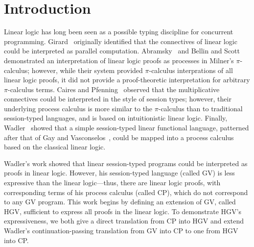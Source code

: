 \documentclass{easychair}
\newcommand{\hgv}{HGV\xspace}
\begin{document}
%
%



\section{Introduction}

Linear logic has long been seen as a possible typing discipline for concurrent programming.
Girard~\cite{Girard87} originally identified that the connectives of linear logic could be
interpreted as parallel computation. Abramsky~\cite{Abramsky92} and Bellin and
Scott~\cite{BellinScott94} demonstrated an interpretation of linear logic proofs as processes in
Milner's $\pi$-calculus; however, while their system provided $\pi$-calculus interprations of all
linear logic proofs, it did not provide a proof-theoretic interpretation for arbitrary
$\pi$-calculus terms. Caires and Pfenning~\cite{CairesPfenning10} observed that the multiplicative
connectives could be interpreted in the style of session types; however, their underlying process
calculus is more similar to the $\pi$-calculus than to traditional session-typed languages, and is
based on intuitionistic linear logic.  Finally, Wadler~\cite{Wadler12} showed that a simple
session-typed linear functional language, patterned after that of Gay and
Vasconselos~\cite{GayVasconcelos10}, could be mapped into a process calculus based on the classical
linear logic.

Wadler's work showed that linear session-typed programs could be interpreted as proofs in linear
logic.  However, his session-typed language (called GV) is less expressive than the linear
logic---thus, there are linear logic proofs, with corresponding terms of his process calculus
(called CP), which do not correspond to any GV program.  This work begins by defining an extension
of GV, called \hgv, sufficient to express all proofs in the linear logic. To demonstrate \hgv's
expressiveness, we both give a direct translation from CP into \hgv and extend Wadler's
continuation-passing translation from GV into CP to one from \hgv into CP.
\end{document}
